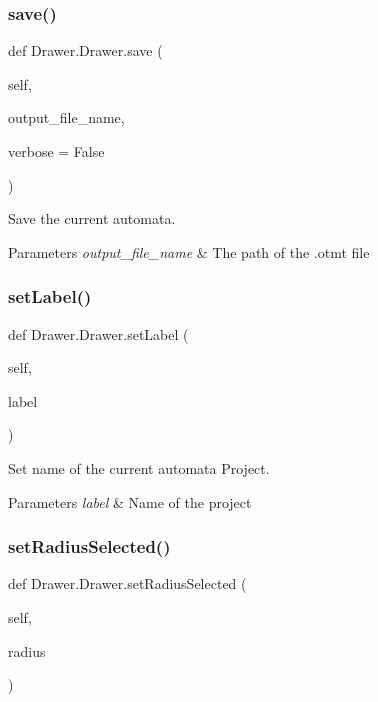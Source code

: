 \subsubsection{\texorpdfstring{save()}{save()}}
{\footnotesize\ttfamily def Drawer.\+Drawer.\+save (\begin{DoxyParamCaption}\item[{}]{self,  }\item[{}]{output\+\_\+file\+\_\+name,  }\item[{}]{verbose = {\ttfamily False} }\end{DoxyParamCaption})}



Save the current automata. 


\begin{DoxyParams}{Parameters}
{\em output\+\_\+file\+\_\+name} & The path of the .otmt file \\
\hline
\end{DoxyParams}
\mbox{\label{classDrawer_1_1Drawer_aec0fcb955a455d1275923b0d9ffb99ec}} 
\subsubsection{\texorpdfstring{setLabel()}{setLabel()}}
{\footnotesize\ttfamily def Drawer.\+Drawer.\+set\+Label (\begin{DoxyParamCaption}\item[{}]{self,  }\item[{}]{label }\end{DoxyParamCaption})}



Set name of the current automata Project. 


\begin{DoxyParams}{Parameters}
{\em label} & Name of the project \\
\hline
\end{DoxyParams}
\mbox{\label{classDrawer_1_1Drawer_a3863b8beea85d01ebc90f997f41d846c}} 
\subsubsection{\texorpdfstring{setRadiusSelected()}{setRadiusSelected()}}
{\footnotesize\ttfamily def Drawer.\+Drawer.\+set\+Radius\+Selected (\begin{DoxyParamCaption}\item[{}]{self,  }\item[{}]{radius }\end{DoxyParamCaption})}



